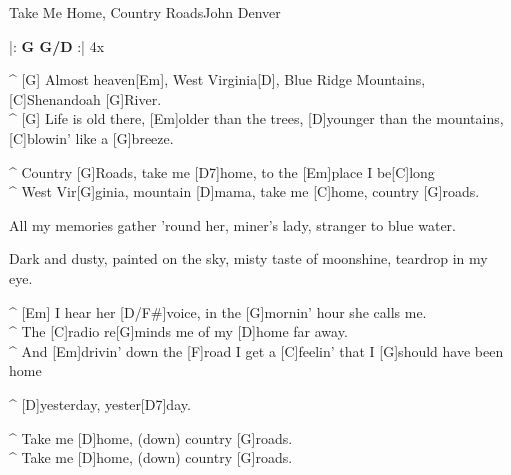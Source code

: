 \begin{song}{Take Me Home, Country Roads}{John Denver}

\vspace{-5mm}
\begin{guitar}
|:\textbf{ G  G/D}  :| 4x\\
\end{guitar}


\begin{guitar}
^ [G]  Almost heaven[Em], West Virginia[D], Blue Ridge Mountains, [C]Shenandoah [G]River.\\
^ [G]  Life is old there, [Em]older than the trees, [D]younger than the mountains, [C]blowin' like a [G]breeze.\\
\end{guitar}

\vspace{-3mm}
\begin{guitar}
^ Country [G]Roads, take me [D7]home, to the [Em]place I be[C]long\\
^ West Vir[G]ginia, mountain [D]mama, take me [C]home, country [G]roads.\\
\end{guitar}


\begin{guitar}
All my memories  gather 'round her, miner's lady, stranger to blue water.\hspace{-3mm}\\
\end{guitar}
\vspace{-3mm}
\begin{guitar}
Dark and dusty, painted on the sky, misty taste of moonshine, teardrop in my eye.\\
\end{guitar}



\begin{guitar}
^ [Em] I hear her [D/F#]voice, in the [G]mornin' hour she calls me.\\
^ The [C]radio re[G]minds me of my [D]home far away.\\
^ And [Em]drivin' down the [F]road I get a [C]feelin' that I [G]should have been home \\
\end{guitar}
\vspace{-3mm}
\begin{guitar}
^ [D]yesterday, yester[D7]day.\\
\end{guitar}




\begin{guitar}
^ Take me [D]home, (down) country [G]roads.\\
^ Take me [D]home, (down) country [G]roads.\\
\end{guitar}
\end{song}
